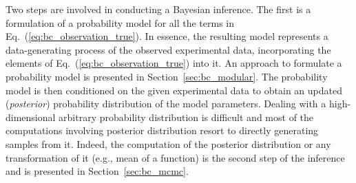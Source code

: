 Two steps are involved in conducting a Bayesian inference.
The first is a formulation of a probability model for all the terms in Eq.~(\ref{eq:bc_observation_true}).
In essence, the resulting model represents a data-generating process of the observed experimental data,
incorporating the elements of Eq.~(\ref{eq:bc_observation_true}) into it.
An approach to formulate a probability model is presented in Section~\ref{sec:bc_modular}.
The probability model is then conditioned on the given experimental data to obtain an updated (\emph{posterior}) probability distribution of the model parameters.
Dealing with a high-dimensional arbitrary probability distribution is difficult and most of the computations involving  posterior distribution resort to directly generating samples from it. 
Indeed, the computation of the posterior distribution or any transformation of it (e.g., mean of a function) is the second step of the inference and is presented in Section~\ref{sec:bc_mcmc}.
